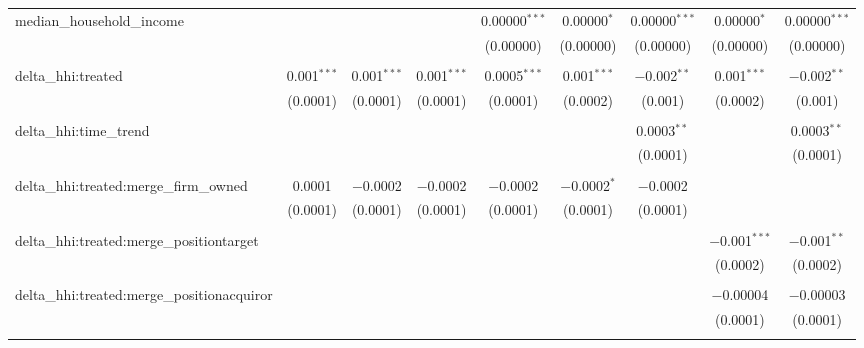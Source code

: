 \begin{table}[H]
{\begin{tabular}{@{\extracolsep{5pt}}lcccccccc}
  median\_household\_income &  &  &  & 0.00000$^{***}$ & 0.00000$^{*}$ & 0.00000$^{***}$ & 0.00000$^{*}$ & 0.00000$^{***}$ \\  

   &  &  &  & (0.00000) & (0.00000) & (0.00000) & (0.00000) & (0.00000) \\  

   & & & & & & & & \\  

  delta\_hhi:treated & 0.001$^{***}$ & 0.001$^{***}$ & 0.001$^{***}$ & 0.0005$^{***}$ & 0.001$^{***}$ & $-$0.002$^{**}$ & 0.001$^{***}$ & $-$0.002$^{**}$ \\  

   & (0.0001) & (0.0001) & (0.0001) & (0.0001) & (0.0002) & (0.001) & (0.0002) & (0.001) \\  

   & & & & & & & & \\  

  delta\_hhi:time\_trend &  &  &  &  &  & 0.0003$^{**}$ &  & 0.0003$^{**}$ \\  

   &  &  &  &  &  & (0.0001) &  & (0.0001) \\  

   & & & & & & & & \\  

  delta\_hhi:treated:merge\_firm\_owned & 0.0001 & $-$0.0002 & $-$0.0002 & $-$0.0002 & $-$0.0002$^{*}$ & $-$0.0002 &  &  \\  

   & (0.0001) & (0.0001) & (0.0001) & (0.0001) & (0.0001) & (0.0001) &  &  \\  

   & & & & & & & & \\  

  delta\_hhi:treated:merge\_positiontarget &  &  &  &  &  &  & $-$0.001$^{***}$ & $-$0.001$^{**}$ \\  

   &  &  &  &  &  &  & (0.0002) & (0.0002) \\  

   & & & & & & & & \\  

  delta\_hhi:treated:merge\_positionacquiror &  &  &  &  &  &  & $-$0.00004 & $-$0.00003 \\  

   &  &  &  &  &  &  & (0.0001) & (0.0001) \\  

   & & & & & & & & \\  


\end{tabular}}
\end{table}
